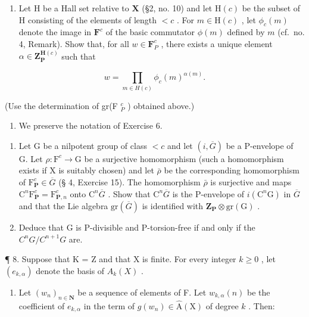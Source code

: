 \begin{enumerate}
\item
  Let \(\mathrm{H}\) be a Hall set relative to \(\mathbf{X}\) (§2, no. 10) and let \(\mathrm{H}(c)\) be the subset of \(\mathrm{H}\) consisting of the elements of length \(< c\) . For \(m \in \mathrm{H}(c)\) , let \(\phi_c(m)\) denote the image in \(\mathbf{F}^c\) of the basic commutator \(\phi(m)\) defined by \(m\) (cf.~no. 4, Remark). Show that, for all \(w \in \mathbf{F}_P^c\) , there exists a unique element \(\alpha \in \mathbf{Z}_{\mathbf{P}}^{\mathbf{H}(c)}\) such that
\end{enumerate}

\[
w = \prod_ {m \in H (c)} \phi_ {c} (m) ^ {\alpha (m)}.
\]

(Use the determination of gr(F \(_{P}^{c}\) ) obtained above.)

\begin{enumerate}
\def\labelenumi{\arabic{enumi}.}
\setcounter{enumi}{6}
\tightlist
\item
  We preserve the notation of Exercise 6.
\end{enumerate}

\begin{enumerate}
\def\labelenumi{(\alph{enumi})}
\item
  Let G be a nilpotent group of class \(<c\) and let \((i, \overline{G})\) be a P-envelope of G. Let \(\rho: \mathrm{F}^{c} \to \mathrm{G}\) be a surjective homomorphism (such a homomorphism exists if X is suitably chosen) and let \(\bar{\rho}\) be the corresponding homomorphism of \(\mathrm{F}_{\mathbf{P}}^{c} \in \overline{G}\) (§ 4, Exercise 15). The homomorphism \(\bar{\rho}\) is surjective and maps \(\mathrm{C}^{n}\mathrm{F}_{\mathbf{P}}^{c} = \mathrm{F}_{\mathbf{P}, n}^{c}\) onto \(\mathrm{C}^{n}\overline{G}\) . Show that \(\mathrm{C}^{n}\overline{G}\) is the P-envelope of \(i(\mathrm{C}^{n}\mathrm{G})\) in \(\overline{G}\) and that the Lie algebra \(\mathrm{gr}(\overline{G})\) is identified with \(\mathbf{Z}_{\mathbf{P}} \otimes \mathrm{gr}(\mathrm{G})\) .
\item
  Deduce that G is P-divisible and P-torsion-free if and only if the \(C^{n}G/C^{n+1}G\) are.
\end{enumerate}

¶ 8. Suppose that K = Z and that X is finite. For every integer \(k \geqslant 0\) , let \((e_{k,\alpha})\) denote the basis of \(A_k(X)\) .

\begin{enumerate}
\def\labelenumi{(\alph{enumi})}
\tightlist
\item
  Let \((w_{n})_{n\in \mathbf{N}}\) be a sequence of elements of F. Let \(w_{k,\alpha}(n)\) be the coefficient of \(e_{k,\alpha}\) in the term of \(g(w_{n})\in \hat{\mathrm{A}} (\mathrm{X})\) of degree \(k\) . Then:
\end{enumerate}

